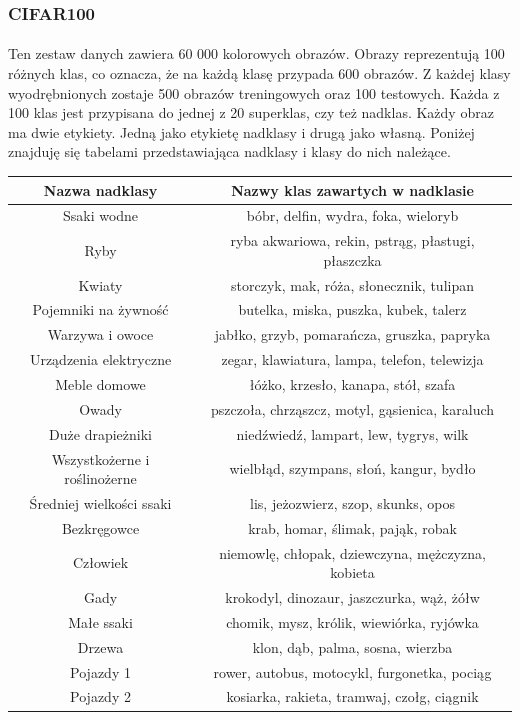 \documentclass[a4paper,11pt]{article}
\begin{document}
\subsubsection{CIFAR100}
\paragraph{}Ten zestaw danych zawiera 60 000 kolorowych obrazów. Obrazy reprezentują 100 różnych klas, co oznacza, że na każdą klasę przypada 600 obrazów. Z każdej klasy wyodrębnionych zostaje 500 obrazów treningowych oraz 100 testowych. Każda z 100 klas jest przypisana do jednej z 20 superklas, czy też nadklas. Każdy obraz ma dwie etykiety. Jedną jako etykietę nadklasy i drugą jako własną. Poniżej znajduję się tabelami przedstawiająca nadklasy i klasy do nich należące.
\begin{tabular}{|c|c|}
\hline Nazwa nadklasy &Nazwy klas zawartych w nadklasie \\ 
\hline Ssaki wodne& bóbr, delfin, wydra, foka, wieloryb\\
\hline Ryby& ryba akwariowa, rekin, pstrąg, płastugi, płaszczka\\
\hline Kwiaty& storczyk, mak, róża, słonecznik, tulipan \\
\hline Pojemniki na żywność& butelka, miska, puszka, kubek, talerz \\
\hline Warzywa i owoce& jabłko, grzyb, pomarańcza, gruszka, papryka \\
\hline Urządzenia elektryczne& zegar, klawiatura, lampa, telefon, telewizja \\
\hline Meble domowe& łóżko, krzesło, kanapa, stół, szafa \\
\hline Owady& pszczoła, chrząszcz, motyl, gąsienica, karaluch \\
\hline Duże drapieżniki& niedźwiedź, lampart, lew, tygrys, wilk \\
\hline Wszystkożerne i roślinożerne & wielbłąd, szympans, słoń, kangur, bydło \\
\hline Średniej wielkości ssaki& lis, jeżozwierz, szop, skunks, opos \\
\hline Bezkręgowce& krab, homar, ślimak, pająk, robak \\
\hline Człowiek& niemowlę, chłopak, dziewczyna, mężczyzna, kobieta \\
\hline Gady& krokodyl, dinozaur, jaszczurka, wąż, żółw \\
\hline Małe ssaki& chomik, mysz, królik, wiewiórka, ryjówka  \\
\hline Drzewa& klon, dąb, palma, sosna, wierzba \\
\hline Pojazdy 1& rower, autobus, motocykl, furgonetka, pociąg \\
\hline Pojazdy 2& kosiarka, rakieta, tramwaj, czołg, ciągnik \\
\hline
\end{tabular}
\end{document}
